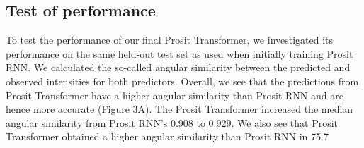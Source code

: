 \documentclass[10pt,a4paper]{article}
\begin{document}
\subsection*{Test of performance}

To test the performance of our final Prosit Transformer, we investigated its performance on the same held-out test set as used when initially training Prosit RNN. We calculated the so-called angular similarity between the predicted and observed intensities for both predictors. Overall, we see that the predictions from Prosit Transformer have a higher angular similarity than Prosit RNN and are hence more accurate (Figure 3A). The Prosit Transformer increased the median angular similarity from Prosit RNN’s 0.908 to 0.929. We also see that Prosit Transformer obtained a higher angular similarity than Prosit RNN in 75.7%
\end{document}

